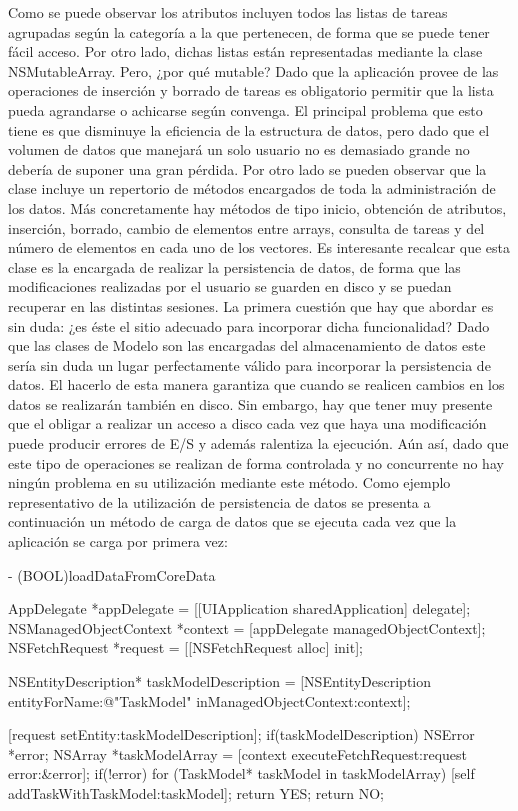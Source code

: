 \documentclass[parskip=half*]{scrartcl}
\begin{document}
Como se puede observar los atributos incluyen todos las listas de tareas agrupadas seg\'un la categor\'ia a la que pertenecen, de forma que se puede tener f\'acil acceso. Por otro lado, dichas listas est\'an representadas mediante la clase NSMutableArray. Pero, ¿por qu\'e mutable? Dado que la aplicaci\'on provee de las operaciones de inserci\'on y borrado de tareas es obligatorio permitir que la lista pueda agrandarse o achicarse seg\'un convenga. El principal problema que esto tiene es que disminuye la eficiencia de la estructura de datos, pero dado que el volumen de datos que manejar\'a un solo usuario no es demasiado grande no deber\'ia de suponer una gran p\'erdida.
Por otro lado se pueden observar que la clase incluye un repertorio de m\'etodos encargados de toda la administraci\'on de los datos. M\'as concretamente hay m\'etodos de tipo inicio, obtenci\'on de atributos, inserci\'on, borrado, cambio de elementos entre arrays, consulta de tareas y del n\'umero de elementos en cada uno de los vectores.
Es interesante recalcar que esta clase es la encargada de realizar la persistencia de datos, de forma que las modificaciones realizadas por el usuario se guarden en disco y se puedan recuperar en las distintas sesiones. La primera cuesti\'on que hay que abordar es sin duda: ¿es \'este el sitio adecuado para incorporar dicha funcionalidad? Dado que las clases de Modelo son las encargadas del almacenamiento de datos este ser\'ia sin duda un lugar perfectamente v\'alido para incorporar la persistencia de datos. El hacerlo de esta manera garantiza que cuando se realicen cambios en los datos se realizar\'an tambi\'en en disco. Sin embargo, hay que tener muy presente que el obligar a realizar un acceso a disco cada vez que haya una modificaci\'on puede producir errores de E/S y adem\'as ralentiza la ejecuci\'on. A\'un as\'i, dado que este tipo de operaciones se realizan de forma controlada y no concurrente no hay ning\'un problema en su utilizaci\'on mediante este m\'etodo.
Como ejemplo representativo de la utilizaci\'on de persistencia de datos se presenta a continuaci\'on un m\'etodo de carga de datos que se ejecuta cada vez que la aplicaci\'on se carga por primera vez:

\begin{verbatimtab}
- (BOOL)loadDataFromCoreData
{
    AppDelegate *appDelegate = [[UIApplication sharedApplication] delegate];
    NSManagedObjectContext *context = [appDelegate managedObjectContext];
    NSFetchRequest *request = [[NSFetchRequest alloc] init];
    
    NSEntityDescription* taskModelDescription = 
    [NSEntityDescription entityForName:@"TaskModel" inManagedObjectContext:context];

    [request setEntity:taskModelDescription];
    if(taskModelDescription){
        NSError *error;
        NSArray *taskModelArray = [context executeFetchRequest:request error:&error];
        if(!error){
            for (TaskModel* taskModel in taskModelArray)
                [self addTaskWithTaskModel:taskModel];
            return YES;
        }
    }
    return NO;
}
\end{verbatimtab}
\end{document}
